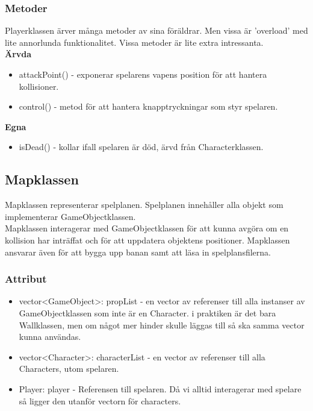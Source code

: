 \documentclass{TDP005mall}
\begin{document}
\subsubsection{Metoder}
Playerklassen ärver många metoder av sina föräldrar. Men vissa är 'overload' med lite annorlunda funktionalitet.
Vissa metoder är lite extra intressanta.\\
\textbf{Ärvda}
\begin{itemize}
  \item attackPoint() - exponerar spelarens vapens position för att hantera kollisioner.
  \item control() - metod för att hantera knapptryckningar som styr spelaren.
\end{itemize}
\textbf{Egna}
\begin{itemize}
  \item isDead() - kollar ifall spelaren är död, ärvd från Characterklassen.
\end{itemize}

\newpage

\subsection{Mapklassen}
Mapklassen representerar spelplanen. Spelplanen innehåller alla objekt som implementerar GameObjectklassen. \\
Mapklassen interagerar med GameObjectklassen för att kunna avgöra om en kollision har inträffat och för att 
uppdatera objektens positioner. Mapklassen ansvarar även för att bygga upp banan samt att läsa in 
spelplansfilerna. \\
\subsubsection{Attribut}
\begin{itemize}
  \item vector<GameObject>: propList - en vector av referenser till alla instanser av GameObjectklassen som inte är en Character. 
  i praktiken är det bara Wallklassen, men om något mer hinder skulle läggas till så ska samma vector kunna användas.
  \item vector<Character>: characterList - en vector av referenser till alla Characters, utom spelaren.
  \item Player: player - Referensen till spelaren. Då vi alltid interagerar med spelare så ligger den utanför vectorn för characters.
\end{itemize}
\end{document}
